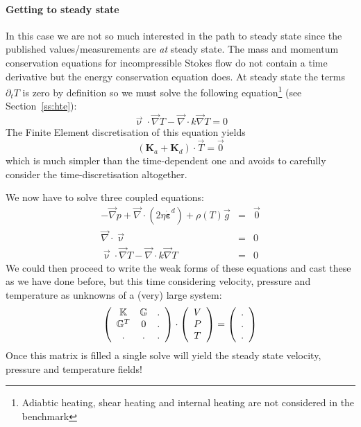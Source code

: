 \paragraph{Getting to steady state}  
In this case we are not so much interested in the path to steady state since 
the published values/measurements are {\it at} steady state.
The mass and momentum conservation equations for incompressible Stokes flow do not 
contain a time derivative but the energy conservation equation does. 
At steady state the terms $\partial_t T$ is zero by definition so we must solve
the following equation\footnote{Adiabtic heating, shear heating and internal heating are not considered
in the benchmark} (see Section~\ref{ss:hte}):
\begin{equation}
\vec{\upnu}\cdot\vec\nabla T - {\vec \nabla} \cdot k {\vec \nabla} T = 0
\end{equation}
The Finite Element discretisation of this equation yields 
\[
({\bm K}_a + {\bm K}_d) \cdot \vec{T} = \vec{0}
\]
which is much simpler than the time-dependent one and avoids to carefully consider the 
time-discretisation altogether. 

We now have to solve three coupled equations:
\begin{eqnarray}
-{\vec \nabla}p + {\vec \nabla}\cdot (2 \eta \dot{\bm \varepsilon}^d ) + \rho(T) {\vec g} &=& \vec{0} \\
{\vec \nabla}\cdot{\vec \upnu} &=& 0 \\ 
\vec{\upnu}\cdot\vec\nabla T - {\vec \nabla} \cdot k {\vec \nabla} T &=& 0 
\end{eqnarray}
We could then proceed to write the weak forms of these equations and cast these as we have done before, 
but this time considering velocity, pressure and temperature as unknowns of a (very) large system:
\[
\left(
\begin{array}{ccc}
{\mathbb{K}} & {\mathbb{G}} & . \\
{\mathbb{G}}^T & 0 & . \\
. & . & . 
\end{array}
\right)
\cdot
\left(
\begin{array}{c}
V \\ P \\ T 
\end{array}
\right)
=
\left(
\begin{array}{c}
. \\ . \\ .
\end{array}
\right)
\]
Once this matrix is filled a single solve will yield the steady state velocity, pressure and 
temperature fields! 

